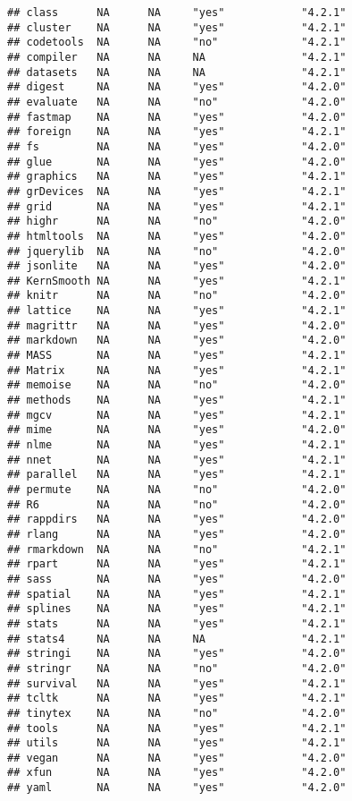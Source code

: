 \documentclass[
]{article}
\begin{document}
\begin{verbatim}
## class      NA      NA     "yes"            "4.2.1"
## cluster    NA      NA     "yes"            "4.2.1"
## codetools  NA      NA     "no"             "4.2.1"
## compiler   NA      NA     NA               "4.2.1"
## datasets   NA      NA     NA               "4.2.1"
## digest     NA      NA     "yes"            "4.2.0"
## evaluate   NA      NA     "no"             "4.2.0"
## fastmap    NA      NA     "yes"            "4.2.0"
## foreign    NA      NA     "yes"            "4.2.1"
## fs         NA      NA     "yes"            "4.2.0"
## glue       NA      NA     "yes"            "4.2.0"
## graphics   NA      NA     "yes"            "4.2.1"
## grDevices  NA      NA     "yes"            "4.2.1"
## grid       NA      NA     "yes"            "4.2.1"
## highr      NA      NA     "no"             "4.2.0"
## htmltools  NA      NA     "yes"            "4.2.0"
## jquerylib  NA      NA     "no"             "4.2.0"
## jsonlite   NA      NA     "yes"            "4.2.0"
## KernSmooth NA      NA     "yes"            "4.2.1"
## knitr      NA      NA     "no"             "4.2.0"
## lattice    NA      NA     "yes"            "4.2.1"
## magrittr   NA      NA     "yes"            "4.2.0"
## markdown   NA      NA     "yes"            "4.2.0"
## MASS       NA      NA     "yes"            "4.2.1"
## Matrix     NA      NA     "yes"            "4.2.1"
## memoise    NA      NA     "no"             "4.2.0"
## methods    NA      NA     "yes"            "4.2.1"
## mgcv       NA      NA     "yes"            "4.2.1"
## mime       NA      NA     "yes"            "4.2.0"
## nlme       NA      NA     "yes"            "4.2.1"
## nnet       NA      NA     "yes"            "4.2.1"
## parallel   NA      NA     "yes"            "4.2.1"
## permute    NA      NA     "no"             "4.2.0"
## R6         NA      NA     "no"             "4.2.0"
## rappdirs   NA      NA     "yes"            "4.2.0"
## rlang      NA      NA     "yes"            "4.2.0"
## rmarkdown  NA      NA     "no"             "4.2.1"
## rpart      NA      NA     "yes"            "4.2.1"
## sass       NA      NA     "yes"            "4.2.0"
## spatial    NA      NA     "yes"            "4.2.1"
## splines    NA      NA     "yes"            "4.2.1"
## stats      NA      NA     "yes"            "4.2.1"
## stats4     NA      NA     NA               "4.2.1"
## stringi    NA      NA     "yes"            "4.2.0"
## stringr    NA      NA     "no"             "4.2.0"
## survival   NA      NA     "yes"            "4.2.1"
## tcltk      NA      NA     "yes"            "4.2.1"
## tinytex    NA      NA     "no"             "4.2.0"
## tools      NA      NA     "yes"            "4.2.1"
## utils      NA      NA     "yes"            "4.2.1"
## vegan      NA      NA     "yes"            "4.2.0"
## xfun       NA      NA     "yes"            "4.2.0"
## yaml       NA      NA     "yes"            "4.2.0"
\end{verbatim}
\end{document}
